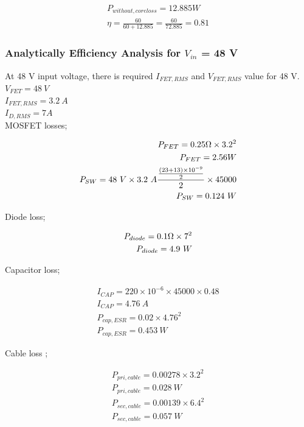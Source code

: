  \begin{align}
     P_{without,coreloss} = 12.885W \\
     \eta = \frac{60}{60+12.885} = \frac{60}{72.885} = 0.81
 \end{align}

 \subsubsection{Analytically Efficiency Analysis for $V_{in}$ = 48 V }

At 48 V input voltage, there is required $I_{FET,RMS}$ and $V_{FET,RMS}$ value for 48 V.\\

$V_{FET} = 48\ V$\\
$I_{FET,RMS}= 3.2\ A$\\
$I_{D,RMS} = 7 A $\\

MOSFET losses;

\begin{align}
     P_{FET} = 0.25 \ohm \times 3.2^2\\
     P_{FET} = 2.56 W \\
     P_{SW} = 48\ V\times 3.2\ A \frac{\frac{(23+13)\times 10^{-9}}{2}}{2}\times 45000 \\
     P_{SW} = 0.124\ W
\end{align}

Diode loss;

\begin{align}
 P_{diode} = 0.1 \ohm \times 7 ^2 \\
 P_{diode} = 4.9\ W
\end{align}

Capacitor loss;

\begin{align}
     I_{CAP} =  220\times 10^{-6} \times 45000 \times 0.48 \\
     I_{CAP} = 4.76\ A\ \\
     P_{cap,ESR} = 0.02 \times 4.76^2 \\
     P_{cap,ESR} = 0.453\ W     
\end{align}

Cable loss ;

 \begin{align}
     P_{pri,cable} = 0.00278 \times 3.2^2 \\
     P_{pri,cable} = 0.028\ W     \\
     P_{sec,cable} = 0.00139 \times 6.4^2 \\
     P_{sec,cable} = 0.057\ W
 \end{align}
 
